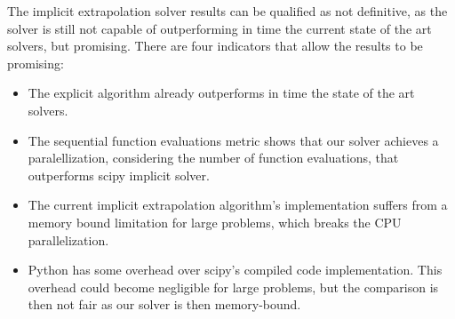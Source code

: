\documentclass[12pt]{article}
\begin{document}
The implicit extrapolation solver results can be qualified as not definitive, as the solver is still not capable of outperforming in time the current state of the art solvers, but promising. There are four indicators that allow the results to be promising:
\begin{itemize}
\item The explicit algorithm already outperforms in time the state of the art solvers.
\item The sequential function evaluations metric shows that our solver achieves a paralellization, considering the number of function evaluations, that outperforms scipy implicit solver.
\item The current implicit extrapolation algorithm's implementation suffers from a memory bound limitation for large problems, which breaks the CPU parallelization.
\item Python has some overhead over scipy's compiled code implementation. This overhead could become negligible for large problems, but the comparison is then not fair as our solver is then memory-bound.
\end{itemize}



\end{document}
